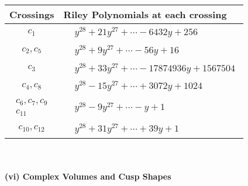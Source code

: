 \documentclass[1p]{elsarticle_modified}
\theoremstyle{definition}
\begin{document}
\begin{tabular}{m{50pt}|m{274pt}}
Crossings & \hspace{64pt}Riley Polynomials at each crossing \\
\hline $$\begin{aligned}c_{1}\end{aligned}$$&$\begin{aligned}
&y^{28}+21 y^{27}+\cdots-6432 y+256
\end{aligned}$\\
\hline $$\begin{aligned}c_{2},c_{5}\end{aligned}$$&$\begin{aligned}
&y^{28}+9 y^{27}+\cdots-56 y+16
\end{aligned}$\\
\hline $$\begin{aligned}c_{3}\end{aligned}$$&$\begin{aligned}
&y^{28}+33 y^{27}+\cdots-17874936 y+1567504
\end{aligned}$\\
\hline $$\begin{aligned}c_{4},c_{8}\end{aligned}$$&$\begin{aligned}
&y^{28}-15 y^{27}+\cdots+3072 y+1024
\end{aligned}$\\
\hline $$\begin{aligned}c_{6},c_{7},c_{9}\\c_{11}\end{aligned}$$&$\begin{aligned}
&y^{28}-9 y^{27}+\cdots- y+1
\end{aligned}$\\
\hline $$\begin{aligned}c_{10},c_{12}\end{aligned}$$&$\begin{aligned}
&y^{28}+31 y^{27}+\cdots+39 y+1
\end{aligned}$\\
\hline
\end{tabular}\\~\\
\newpage\flushleft \textbf{(vi) Complex Volumes and Cusp Shapes}
\end{document}
